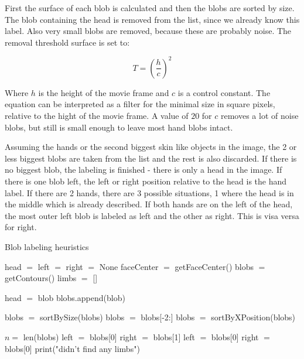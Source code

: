 First the surface of each blob is calculated and then the blobs are sorted by size. The blob containing the head is removed from the list, since we already know this label. Also very small blobs are removed, because these are probably noise. The removal threshold surface is set to:

\begin{equation}
T = (\frac{h}{c})^2
\end{equation}

Where $h$ is the height of the movie frame and $c$ is a control constant. The equation can be interpreted as a filter for the minimal size in square pixels, relative to the hight of the movie frame. A value of $20$ for $c$ removes a lot of noise blobs, but still is small enough to leave most hand blobs intact.

Assuming the hands or the second biggest skin like objects in the image, the 2 or less biggest blobs are taken from the list and the rest is also discarded. If there is no biggest blob, the labeling is finished - there is only a head in the image. If there is one blob left, the left or right position relative to the head is the hand label. If there are 2 hands, there are 3 possible situations, 1 where the head is in the middle which is already described. If both hands are on the left of the head, the most outer left blob is labeled as left and the other as right. This is visa versa for right.

\begin{algorithm}
\caption{Blob labeling heuristics}
\label{blobheuristics}
\begin{algorithmic}
	\STATE head $=$ left $=$ right $=$ None
	\STATE faceCenter $=$ getFaceCenter()
	\STATE blobs $=$ getContours()
	\STATE limbs $=$ []
	
			\STATE head $=$ blob
		\ELSE
			\STATE blobs.append(blob)
		\ENDIF
	\ENDFOR

	\STATE blobs $=$ sortBySize(blobs)
	\STATE blobs $=$ blobs[-2:]
	\STATE blobs $=$ sortByXPosition(blobs)

	\STATE $n = $ len(blobs)
	    \STATE left $=$ blobs[0]
	    \STATE right $=$ blobs[1]
	\ELSE
		        \STATE left $=$ blobs[0]
		    \ELSE
		        \STATE right $=$ blobs[0]
			\ENDIF
		\ENDIF
	\ELSE
	    \STATE print("didn't find any limbs")
	\ENDIF
\end{algorithmic}
\end{algorithm}



